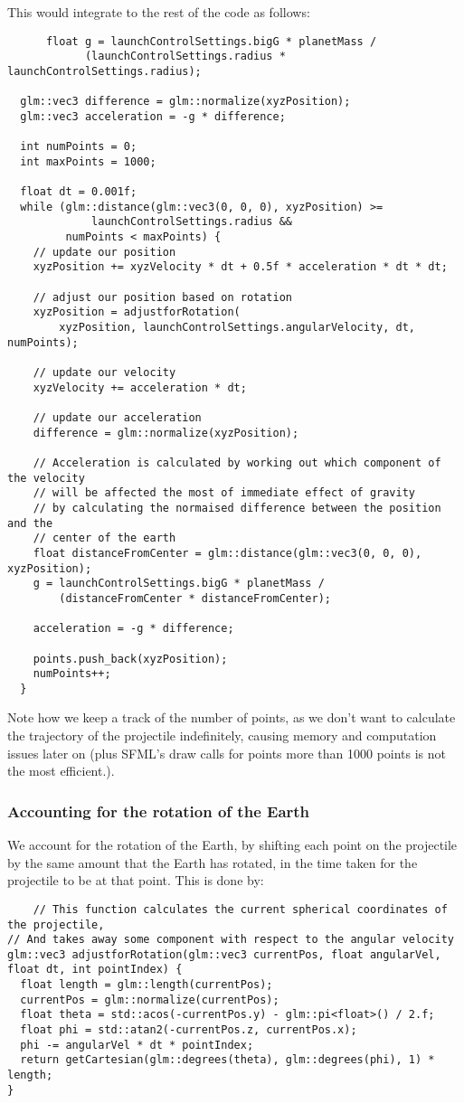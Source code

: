 \documentclass[main.tex]{subfiles}
\begin{document}
This would integrate to the rest of the code as follows:
\begin{lstlisting}
      float g = launchControlSettings.bigG * planetMass /
            (launchControlSettings.radius * launchControlSettings.radius);

  glm::vec3 difference = glm::normalize(xyzPosition);
  glm::vec3 acceleration = -g * difference;

  int numPoints = 0;
  int maxPoints = 1000;

  float dt = 0.001f;
  while (glm::distance(glm::vec3(0, 0, 0), xyzPosition) >=
             launchControlSettings.radius &&
         numPoints < maxPoints) {
    // update our position
    xyzPosition += xyzVelocity * dt + 0.5f * acceleration * dt * dt;

    // adjust our position based on rotation
    xyzPosition = adjustforRotation(
        xyzPosition, launchControlSettings.angularVelocity, dt, numPoints);

    // update our velocity
    xyzVelocity += acceleration * dt;

    // update our acceleration
    difference = glm::normalize(xyzPosition);

    // Acceleration is calculated by working out which component of the velocity
    // will be affected the most of immediate effect of gravity
    // by calculating the normaised difference between the position and the
    // center of the earth
    float distanceFromCenter = glm::distance(glm::vec3(0, 0, 0), xyzPosition);
    g = launchControlSettings.bigG * planetMass /
        (distanceFromCenter * distanceFromCenter);

    acceleration = -g * difference;

    points.push_back(xyzPosition);
    numPoints++;
  }
\end{lstlisting}
Note how we keep a track of the number of points, as we don't
want to calculate the trajectory of the projectile indefinitely, causing memory and computation issues later on (plus SFML's draw calls for points more
than 1000 points is not the most efficient.).

\subsubsection{Accounting for the rotation of the Earth}
We account for the rotation of the Earth, by shifting each point on the projectile by the same amount that the Earth has rotated, in the 
time taken for the projectile to be at that point. This is done by:
\begin{lstlisting}
    // This function calculates the current spherical coordinates of the projectile,
// And takes away some component with respect to the angular velocity
glm::vec3 adjustforRotation(glm::vec3 currentPos, float angularVel, float dt, int pointIndex) {
  float length = glm::length(currentPos);
  currentPos = glm::normalize(currentPos);
  float theta = std::acos(-currentPos.y) - glm::pi<float>() / 2.f;
  float phi = std::atan2(-currentPos.z, currentPos.x);
  phi -= angularVel * dt * pointIndex;
  return getCartesian(glm::degrees(theta), glm::degrees(phi), 1) * length;
}
\end{lstlisting}
\end{document}
